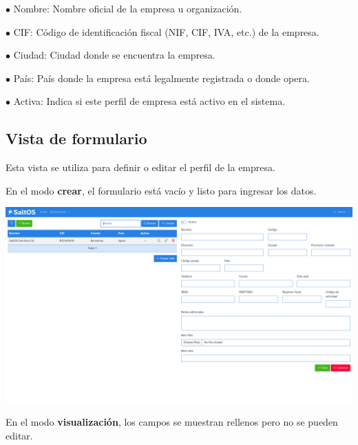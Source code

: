 \documentclass[a4paper]{article}
\begin{document}
\begin{compactitem}
\item[\color{myblue}$\bullet$] Nombre: Nombre oficial de la empresa u organización.
\item[\color{myblue}$\bullet$] CIF: Código de identificación fiscal (NIF, CIF, IVA, etc.) de la empresa.
\item[\color{myblue}$\bullet$] Ciudad: Ciudad donde se encuentra la empresa.
\item[\color{myblue}$\bullet$] País: País donde la empresa está legalmente registrada o donde opera.
\item[\color{myblue}$\bullet$] Activa: Indica si este perfil de empresa está activo en el sistema.
\end{compactitem}

\hypertarget{toc44}{}
\subsection{Vista de formulario}

Esta vista se utiliza para definir o editar el perfil de la empresa.

En el modo \textbf{crear}, el formulario está vacío y listo para ingresar los datos.

\begin{center}\includegraphics[width=1\textwidth]{../ujest/snaps/test-screenshots-js-screenshots-company-company-create-es-es-1-snap.png}\end{center}

En el modo \textbf{visualización}, los campos se muestran rellenos pero no se pueden editar.
\end{document}
